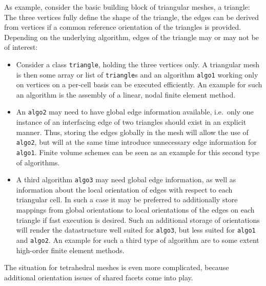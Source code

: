 As example, consider the basic building block of triangular meshes, a triangle: The three vertices fully define the shape of the triangle, the edges can be derived from vertices if a common reference orientation of the triangles is provided. Depending on the underlying algorithm, edges of the triangle may or may not be of interest:
\begin{itemize}
 \item Consider a class \lstinline|triangle|, holding the three vertices only. A triangular mesh is then some array or list of \lstinline|triangle|s and an algorithm \texttt{algo1} working only on vertices on a per-cell basis can be executed efficiently. An example for such an algorithm is the assembly of a linear, nodal finite element method.

 \item An \texttt{algo2} may need to have global edge information available, i.e.~only one instance of an interfacing edge of two triangles should exist in an explicit manner.
       Thus, storing the edges globally in the mesh will allow the use of \texttt{algo2}, but will at the same time introduce unnecessary edge information for \texttt{algo1}. Finite volume schemes can be seen as an example for this second type of algorithms.

 \item A third algorithm \texttt{algo3} may need global edge information, as well as information about the local orientation of edges with respect to each triangular cell.
      In such a case it may be preferred to additionally store mappings from global orientations to local orientations of the edges on each triangle if fast execution is desired.
      Such an additional storage of orientations will render the datastructure well suited for \texttt{algo3}, but less suited for \texttt{algo1} and \texttt{algo2}.
      An example for such a third type of algorithm are to some extent high-order finite element methods.
\end{itemize}
The situation for tetrahedral meshes is even more complicated, because additional orientation issues of shared facets come into play.

